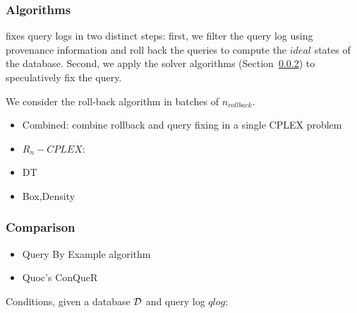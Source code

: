 \iffalse
\subsubsection{Algorithms}

\sys fixes query logs in two distinct steps: first, we filter the query log using 
provenance information and roll back the queries to compute the $ideal$ states of the database.
Second, we apply the solver algorithms (Section~\ref{}) to speculatively fix the query.

We consider the roll-back algorithm in batches of $n_{rollback}$.

\begin{itemize}
\item Combined:  combine rollback and query fixing in a single CPLEX problem
\item $R_n-CPLEX$: 
\item DT
\item Box,Density
\end{itemize}



\subsubsection{Comparison}

\begin{itemize}
\item Query By Example algorithm
\item Quoc's ConQueR
\end{itemize}

Conditions, given a database ${\cal D}$ and query log $qlog$:

